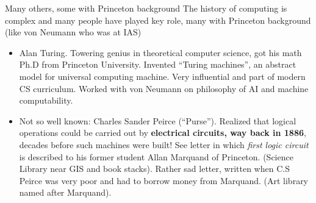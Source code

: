 \documentclass[aspectratio=169]{beamer}
\newcommand{\mypause}{}
\begin{document}
\begin{frame}{Many others, some with Princeton background}
  The history of computing is complex and many people have played key
  role, many with Princeton background (like von Neumann who was at
  IAS)
  \begin{itemize}
  \item Alan Turing. Towering genius in theoretical computer science,
    got his math Ph.D from Princeton University. Invented ``Turing
    machines'', an abstract model for universal computing
    machine. Very influential and part of modern CS curriculum. Worked
    with von Neumann on philosophy of AI and machine computability.%
    \mypause%
  \item Not so well known: Charles Sander Peirce (``Purse''). Realized
    that logical operations could be carried out by {\bf electrical
      circuits, way back in 1886}, decades before such machines were
    built! See letter in which \emph{first logic circuit} is described
    to his former student Allan Marquand of Princeton. (Science
    Library near GIS and book stacks). Rather sad letter, written when
    C.S Peirce was very poor and had to borrow money from Marquand. (Art
    library named after Marquand).
  \end{itemize}
\end{frame}
\end{document}
